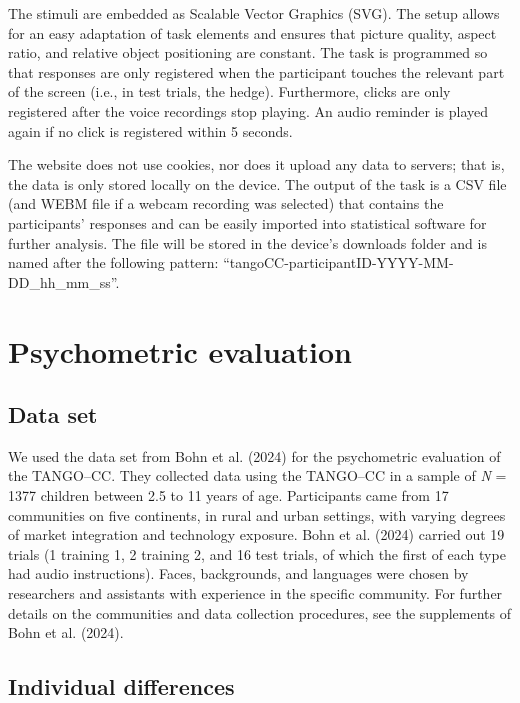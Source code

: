\documentclass[
  man,floatsintext]{apa7}
\begin{document}
The stimuli are embedded as Scalable Vector Graphics (SVG).
The setup allows for an easy adaptation of task elements and ensures that picture quality, aspect ratio, and relative object positioning are constant.
The task is programmed so that responses are only registered when the participant touches the relevant part of the screen (i.e., in test trials, the hedge).
Furthermore, clicks are only registered after the voice recordings stop playing.
An audio reminder is played again if no click is registered within 5 seconds.

The website does not use cookies, nor does it upload any data to servers; that is, the data is only stored locally on the device.
The output of the task is a CSV file (and WEBM file if a webcam recording was selected) that contains the participants' responses and can be easily imported into statistical software for further analysis.
The file will be stored in the device's downloads folder and is named after the following pattern: ``tangoCC-participantID-YYYY-MM-DD\_hh\_mm\_ss''.

\section{Psychometric evaluation}\label{psychometric-evaluation}

\subsection{Data set}\label{data-set}

We used the data set from Bohn et al. (2024) for the psychometric evaluation of the TANGO--CC.
They collected data using the TANGO--CC in a sample of \emph{N} = 1377 children between 2.5 to 11 years of age.
Participants came from 17 communities on five continents, in rural and urban settings, with varying degrees of market integration and technology exposure.
Bohn et al. (2024) carried out 19 trials (1 training 1, 2 training 2, and 16 test trials, of which the first of each type had audio instructions).
Faces, backgrounds, and languages were chosen by researchers and assistants with experience in the specific community.
For further details on the communities and data collection procedures, see the supplements of Bohn et al. (2024).

\subsection{Individual differences}\label{individual-differences}
\end{document}
